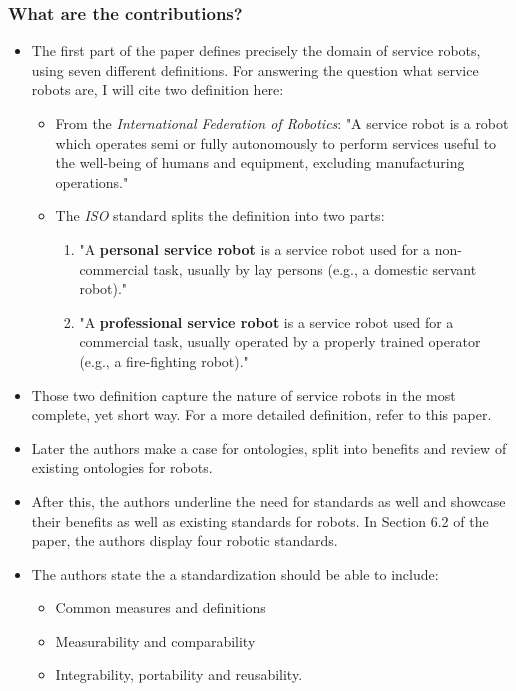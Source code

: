 \subsubsection*{What are the contributions?}
\begin{itemize}
    \item The first part of the paper defines precisely the domain of service robots, using seven different definitions. For answering the question what service robots are, I will cite two definition here: \ \begin{itemize}
        \item From the \emph{International Federation of Robotics}: "A service robot is a robot which operates semi or
        fully autonomously to perform services useful to the well-being of
        humans and equipment, excluding manufacturing operations." 
        \item The \emph{ISO} standard splits the definition into two parts: \ \begin{enumerate}
            \item "A \textbf{personal service robot} is a service robot used for
            a non-commercial task, usually by lay persons (e.g., a domestic
            servant robot)."
            \item "A \textbf{professional service robot} is a service robot used
            for a commercial task, usually operated by a properly trained
            operator (e.g., a fire-fighting robot)."            
        \end{enumerate}
    \end{itemize}  
    \item Those two definition capture the nature of service robots in the most complete, yet short way. For a more detailed definition, refer to this paper.
    \item Later the authors make a case for ontologies, split into benefits and review of existing ontologies for robots. 
    \item After this, the authors underline the need for standards as well and showcase their benefits as well as existing standards for robots. In Section 6.2 of the paper, the authors display four robotic standards. 
    \item The authors state the a standardization should be able to include: \ \begin{itemize}
        \item Common measures and definitions
        \item Measurability and comparability 
        \item Integrability, portability and reusability.
    \end{itemize}
\end{itemize}
